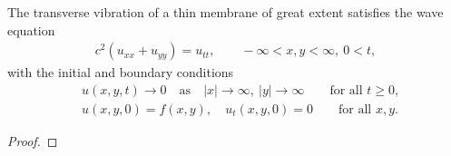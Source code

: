 \begin{problem}{2.48}
  The transverse vibration of a thin membrane of great extent satisfies the wave equation
  \begin{align*}
    c^2(u_{xx} + u_{yy}) = u_{tt}, \qquad -\infty < x, y < \infty,\ 0 < t,
  \end{align*}
  with the initial and boundary conditions
  \begin{align*}
    &u(x, y, t) \to 0 \quad \text{as} \quad |x| \to \infty,\ |y| \to \infty \qquad \text{for all $t\geq 0$},\\
    &u(x, y, 0) = f(x, y),\quad u_t(x, y, 0) = 0 \qquad \text{for all $x, y$}.
  \end{align*}
\end{problem}

\begin{proof}
\end{proof}
\newpage
